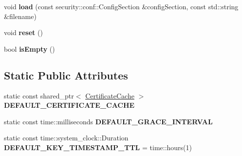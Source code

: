 \begin{DoxyCompactItemize}
\item 
void {\bfseries load} (const security\+::conf\+::\+Config\+Section \&config\+Section, const std\+::string \&filename)\hypertarget{classndn_1_1ValidatorConfig_a12c08eb293ba90f99ff905d03bf047cc}{}\label{classndn_1_1ValidatorConfig_a12c08eb293ba90f99ff905d03bf047cc}

\item 
void {\bfseries reset} ()\hypertarget{classndn_1_1ValidatorConfig_a640483e4fcbbd59465592cb58e3ea4d9}{}\label{classndn_1_1ValidatorConfig_a640483e4fcbbd59465592cb58e3ea4d9}

\item 
bool {\bfseries is\+Empty} ()\hypertarget{classndn_1_1ValidatorConfig_a43317f599467326f2e9c53a6e1aef372}{}\label{classndn_1_1ValidatorConfig_a43317f599467326f2e9c53a6e1aef372}

\end{DoxyCompactItemize}
\subsection*{Static Public Attributes}
\begin{DoxyCompactItemize}
\item 
static const shared\+\_\+ptr$<$ \hyperlink{classndn_1_1CertificateCache}{Certificate\+Cache} $>$ {\bfseries D\+E\+F\+A\+U\+L\+T\+\_\+\+C\+E\+R\+T\+I\+F\+I\+C\+A\+T\+E\+\_\+\+C\+A\+C\+HE}\hypertarget{classndn_1_1ValidatorConfig_a44382cf255eee2f22ff0a35415425410}{}\label{classndn_1_1ValidatorConfig_a44382cf255eee2f22ff0a35415425410}

\item 
static const time\+::milliseconds {\bfseries D\+E\+F\+A\+U\+L\+T\+\_\+\+G\+R\+A\+C\+E\+\_\+\+I\+N\+T\+E\+R\+V\+AL}\hypertarget{classndn_1_1ValidatorConfig_a93fec9e0210c8a8d4bde6544942b4023}{}\label{classndn_1_1ValidatorConfig_a93fec9e0210c8a8d4bde6544942b4023}

\item 
static const time\+::system\+\_\+clock\+::\+Duration {\bfseries D\+E\+F\+A\+U\+L\+T\+\_\+\+K\+E\+Y\+\_\+\+T\+I\+M\+E\+S\+T\+A\+M\+P\+\_\+\+T\+TL} = time\+::hours(1)\hypertarget{classndn_1_1ValidatorConfig_afdf7ff223916c1daeae827db33122e08}{}\label{classndn_1_1ValidatorConfig_afdf7ff223916c1daeae827db33122e08}

\end{DoxyCompactItemize}
